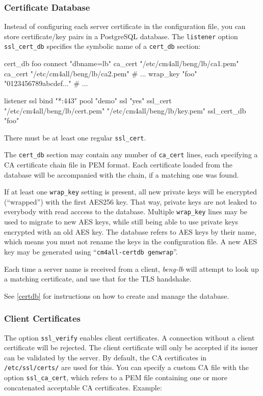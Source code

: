 \documentclass[a4paper,12pt]{article}
\begin{document}
\subsubsection{Certificate Database}
\label{certdbconfig}

Instead of configuring each server certificate in the configuration
file, you can store certificate/key pairs in a PostgreSQL database.
The \texttt{listener} option \verb|ssl_cert_db| specifies the symbolic
name of a \verb|cert_db| section:

\begin{verbatim*}
cert_db foo {
  connect "dbname=lb"
  ca_cert "/etc/cm4all/beng/lb/ca1.pem"
  ca_cert "/etc/cm4all/beng/lb/ca2.pem"
  # ...
  wrap_key "foo" "0123456789abcdef..."
  # ...
}

listener ssl {
  bind "*:443"
  pool "demo"
  ssl "yes"
  ssl_cert "/etc/cm4all/beng/lb/cert.pem" "/etc/cm4all/beng/lb/key.pem"
  ssl_cert_db "foo"
}
\end{verbatim*}

There must be at least one regular \verb|ssl_cert|.

The \verb|cert_db| section may contain any number of \verb|ca_cert|
lines, each specifying a CA certificate chain file in PEM format.
Each certificate loaded from the database will be accompanied with the
chain, if a matching one was found.

If at least one \verb|wrap_key| setting is present, all new private
keys will be encrypted (``wrapped'') with the first AES256 key.  That
way, private keys are not leaked to everybody with read acccess to the
database.  Multiple \verb|wrap_key| lines may be used to migrate to
new AES keys, while still being able to use private keys encrypted
with an old AES key.  The database refers to AES keys by their name,
which means you must not rename the keys in the configuration file.  A
new AES key may be generated using ``\verb|cm4all-certdb genwrap|''.

Each time a server name is received from a client, \emph{beng-lb} will
attempt to look up a matching certificate, and use that for the TLS
handshake.

See \ref{certdb} for instructions on how to create and manage the
database.

\subsubsection{Client Certificates}

The option \verb|ssl_verify| enables client certificates.  A
connection without a client certificate will be rejected.  The client
certificate will only be accepted if its issuer can be validated by
the server.  By default, the CA certificates in \verb|/etc/ssl/certs/|
are used for this.  You can specify a custom CA file with the option
\verb|ssl_ca_cert|, which refers to a PEM file containing one or more
concatenated acceptable CA certificates.  Example:
\end{document}
